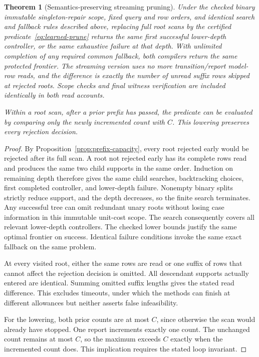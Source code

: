 \documentclass[11pt,letterpaper]{article}
\theoremstyle{plain}
\newtheorem{theorem}{Theorem}[section]
\theoremstyle{definition}
\begin{document}
\begin{theorem}[Semantics-preserving streaming pruning]\label{thm:streaming-pruning}
Under the checked binary immutable singleton-repair scope, fixed query and row orders, and identical search and fallback rules described above, replacing full root scans by the certified predicate~\eqref{eq:learned-prune} returns the same first successful lower-depth controller, or the same exhaustive failure at that depth. With unlimited completion of any required common fallback, both compilers return the same protected frontier. The streaming version uses no more transition/report model-row reads, and the difference is exactly the number of unread suffix rows skipped at rejected roots. Scope checks and final witness verification are included identically in both read accounts.

Within a root scan, after a prior prefix has passed, the predicate can be evaluated by comparing only the newly incremented count with $C$. This lowering preserves every rejection decision.
\end{theorem}
\begin{proof}
By Proposition~\ref{prop:prefix-capacity}, every root rejected early would be rejected after its full scan. A root not rejected early has its complete rows read and produces the same two child supports in the same order. Induction on remaining depth therefore gives the same child searches, backtracking choices, first completed controller, and lower-depth failure. Nonempty binary splits strictly reduce support, and the depth decreases, so the finite search terminates. Any successful tree can omit redundant unary roots without losing case information in this immutable unit-cost scope. The search consequently covers all relevant lower-depth controllers. The checked lower bounds justify the same optimal frontier on success. Identical failure conditions invoke the same exact fallback on the same problem.

At every visited root, either the same rows are read or one suffix of rows that cannot affect the rejection decision is omitted. All descendant supports actually entered are identical. Summing omitted suffix lengths gives the stated read difference. This excludes timeouts, under which the methods can finish at different allowances but neither asserts false infeasibility.

For the lowering, both prior counts are at most $C$, since otherwise the scan would already have stopped. One report increments exactly one count. The unchanged count remains at most $C$, so the maximum exceeds $C$ exactly when the incremented count does. This implication requires the stated loop invariant.
\end{proof}
\end{document}
